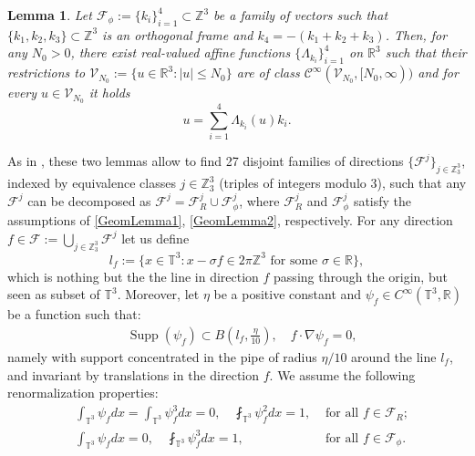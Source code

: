 \documentclass[10pt,a4paper]{amsart}
\numberwithin{equation}{section}
\numberwithin{corollario}{section}
\newtheorem{lemma}{Lemma}
\numberwithin{lemma}{section}
\numberwithin{prop}{section}
\theoremstyle{definition}
\theoremstyle{remark}
\newcommand{\Z}{\mathbb{Z}}
\newcommand{\R}{\mathbb{R}}
\newcommand{\T}{\mathbb{T}}
\newcommand{\F}{\mathcal{F}}
\newcommand{\C}{\mathscr{C}}
\newcommand{\lambdai}{\Lambda_{k_i}}
\DeclareMathOperator{\supp}{Supp}
\begin{document}
\begin{lemma}%
\label{GeomLemma2}
   Let $\mathcal{F_{\phi}}:=\{k_i\}_{i=1}^4\subset \Z^3$ be a family of vectors such that $\{k_1,k_2,k_3\}\subset \Z^3$ is an orthogonal frame and $k_4 = -(k_1+k_2+k_3)$. 
    Then, for any $N_0>0$, there exist real-valued affine functions $\{\lambdai\}_{i=1}^4$ on $\R^3$ such that their restrictions to $\mathcal{V}_{N_0}:=\{u \in \R^3: |u|\le N_0\}$ are of class $\C^{\infty}(\mathcal{V}_{N_0},[N_0,\infty))$ and for every $u \in \mathcal{V}_{N_0}$ it holds
    \begin{equation}\label{RapprFormVect}
        u=\sum\limits_{i=1}^4\lambdai(u)k_i.
    \end{equation}
\end{lemma}

As in \cite{DLK23}, these two lemmas allow to find 27 disjoint families of directions $\{\F^j\}_{j\in\Z^3_3}$, indexed by equivalence classes $j \in \Z^3_3$ (triples of integers modulo $3$), such that any $\F^j$ can be decomposed as $\F^j=\F^j_R\cup\F^j_{\phi}$, where $\F^j_R$ and $\F^j_{\phi}$ satisfy the assumptions of \autoref{GeomLemma1}, \autoref{GeomLemma2}, respectively.
For any direction $f\in \F := \bigcup_{j \in \Z^3_3} \mathcal{F}^j$ let us define 
\begin{equation}
l_f:=\{x \in \T^3: x-\sigma f \in 2\pi\Z^3 \text{ for some }\sigma \in \R\},
\end{equation}
which is nothing but the the line in direction $f$ passing through the origin, but seen as subset of $\T^3$.
Moreover, let $\eta$ be a positive constant and $\psi_f\in C^{\infty}(\T^3,\R)$ be a function such that:
\begin{align}
    &\label{a:psi1}\supp(\psi_f)\subset B\left(l_f,\frac{\eta}{10}\right),\quad f\cdot \nabla\psi_f=0,
    \end{align}
namely with support concentrated in the pipe of radius $\eta/10$ around the line $l_f$, and invariant by translations in the direction $f$. We assume the following renormalization properties:
    \begin{align}
    &\label{e:meanPipesR}
    \int_{\T^3} \psi_fdx = \int_{\T^3} \psi_f^3dx = 0,
    \quad 
    \fint_{\T^3} \psi_f^2dx=1, 
    &\text{ for all } f\in \F_R;
    \\
    &\label{e:meanPipesPhi}
    \int_{\T^3} \psi_fdx = 0, 
    \quad 
    \fint_{\T^3} \psi^3_fdx = 1,
    &\text{ for all } f\in \F_\phi.
\end{align}
\end{document}

